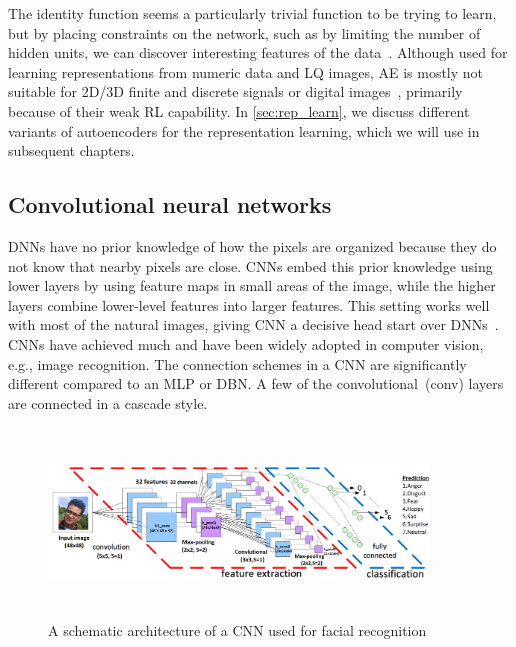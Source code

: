 \hspace*{3.5mm} The identity function seems a particularly trivial function to be trying to learn, but by placing constraints on the network, such as by limiting the number of hidden units, we can discover interesting features of the data~\cite{karimDLTF2018}. Although used for learning representations from numeric data and LQ images, AE is mostly not suitable for 2D/3D finite and discrete signals or digital images~\cite{min2018survey}, primarily because of their weak RL capability. In \cref{sec:rep_learn}, we discuss different variants of autoencoders for the representation learning, which we will use in subsequent chapters. 

\subsection{Convolutional neural networks}
DNNs have no prior knowledge of how the pixels are organized because they do not know that nearby pixels are close. CNNs embed this prior knowledge using lower layers by using feature maps in small areas of the image, while the higher layers combine lower-level features into larger features. This setting works well with most of the natural images, giving CNN a decisive head start over DNNs~\cite{karimIoT2019}. CNNs have achieved much and have been widely adopted in computer vision, e.g., image recognition. The connection schemes in a CNN are significantly different compared to an MLP or DBN. A few of the convolutional~(conv) layers are connected in a cascade style. 

\begin{figure}[h]
    \centering
    \includegraphics[width=0.9\textwidth,height=50mm]{images/cnn.png}
    \caption{A schematic architecture of a CNN used for facial recognition~\cite{karim2017predictive,zaccone2018deep}}
    \label{fig:cnn_theory1}
\end{figure}

